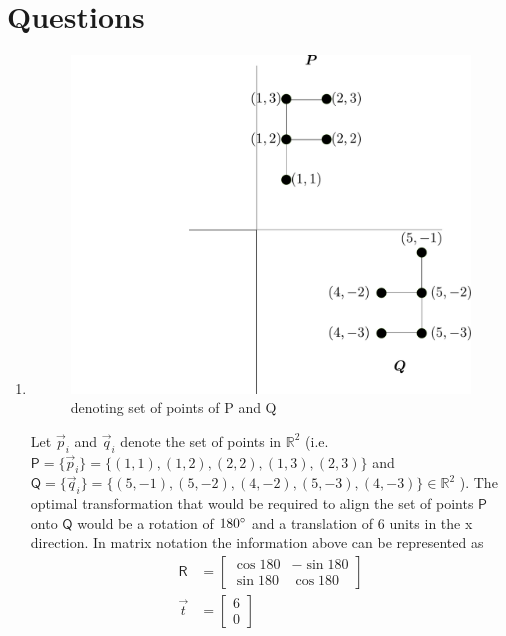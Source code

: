 \documentclass[a4paper, 11pt]{article}
\newcommand{\mat}[1]{\boldsymbol { \mathsf{#1}} }
\newcommand{\R}{\mathbb{R}}
\begin{document}
\section*{Questions}
\begin{enumerate}
    
\item 
\begin{figure}[h]

\includegraphics[width=12cm]{fig1.pdf} 
\centering
\caption{denoting set of points of P and Q}
\end{figure}
Let $\vec p_i$ and $\vec q_i$ denote the set of points in $\R^2$ (i.e. $\mat P = \{\vec p_i \} = \{(1,1), (1,2), (2,2), (1,3), (2,3)\}$ and $\mat Q = \{\vec q_i \} = \{(5,-1), (5,-2), (4,-2), (5,-3), (4,-3)\} \in \R^{2}$ ). The optimal transformation that would be required to align the set of points $\mat P$ onto $\mat Q$ would be a rotation of $180\degree$ and a translation of 6 units in the x direction. In matrix notation the information above can be represented as 
\begin{align*}
\mat R &= 
  \begin{bmatrix}
\cos {180} & -\sin{180}\\
\sin {180} & \cos{180}
\end{bmatrix} \\
\vec t &= \begin{bmatrix} 6 \\ 0 \end{bmatrix}
\end{align*}



\end{enumerate}
\end{document}
